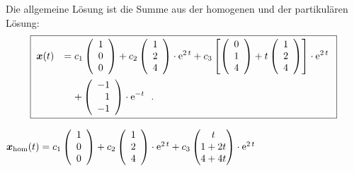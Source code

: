 {Die allgemeine L\"osung ist die Summe aus der homogenen und der partikul\"aren L\"osung:
  \[
\boxed{
\begin{array}{@{\;}rc@{\;}l}
 \vec x(t) & = & \displaystyle c_1\left(\begin{array}{c} 1 \\ 0 \\ 0 \end{array}\right) + c_2\left(\begin{array}{c} 1 \\ 2 \\ 4 \end{array}\right)\cdot\EH{2\,t} + c_3\left[\left(\begin{array}{c} 0 \\ 1 \\ 4 \end{array}\right)+t\left(\begin{array}{c} 1 \\ 2 \\ 4 \end{array}\right)\right]\cdot\EH{2\,t}\\[4ex]
&& \displaystyle + 	\left(\begin{array}{r} -1 \\ 1 \\ -1 \end{array}\right)\cdot\EH{-t}\ \ .
\end{array}}
\]


}


{
$	\boldsymbol x_{\mathrm{hom}} (t) = c_1\left(\begin{array}{c} 1 \\ 0 \\ 0 \end{array}\right) + c_2\left(\begin{array}{c} 1 \\ 2 \\ 4 \end{array}\right)\cdot\mathrm{e}^{2\,t} + c_3\begin{pmatrix} t\\ 1+2t \\ 4+4t \end{pmatrix}\cdot\mathrm{e}^{2\,t}$

}


